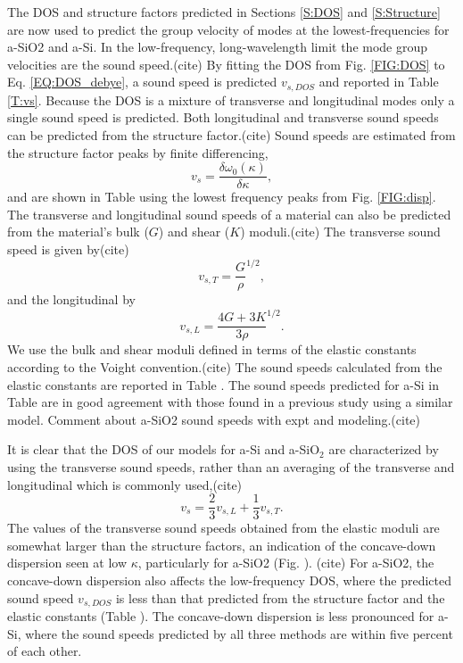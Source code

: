 \documentclass[aps,prb,onecolumn,preprint,superscriptaddress,footinbib,amsmath,amssymb,floatfix]{revtex4}
\begin{document}
The DOS and structure factors predicted in Sections \ref{S:DOS} and 
\ref{S:Structure} are now used to 
predict the group velocity of modes at the lowest-frequencies for 
a-SiO2 and a-Si. In the low-frequency, long-wavelength limit the 
mode group velocities are the sound speed.(cite) 
By fitting the DOS 
from Fig. \ref{FIG:DOS} to Eq. \eqref{EQ:DOS_debye}, 
a sound speed is predicted $v_{s,DOS}$ and 
reported in Table \ref{T:vs}. Because the DOS is a mixture of 
transverse and longitudinal modes only a single sound speed is predicted. 
Both longitudinal and transverse sound speeds can be predicted from 
the structure factor.(cite) 
Sound speeds are estimated from the structure factor peaks by finite 
differencing,\begin{equation}\label{EQ:vs_dwdk}
v_{s} = \frac{ \delta \omega_0(\kappa)}{\delta \kappa},
\end{equation}
and are shown in Table using the lowest frequency peaks 
from Fig. \ref{FIG:disp}. 
The transverse and longitudinal sound speeds of a material can 
also be predicted from the material's bulk ($G$) and 
shear ($K$) moduli.(cite) The transverse sound speed is given by(cite)  
\begin{equation}\label{EQ:vs_T_elas}
v_{s,T} = \frac{G}{\rho}^{1/2},
\end{equation}
and the longitudinal by
\begin{equation}\label{EQ:vs_L_elas}
v_{s,L} = \frac{4G + 3K}{3\rho}^{1/2}.
\end{equation}
We use the bulk and shear moduli defined in terms of the elastic 
constants according to the Voight convention.(cite) 
The sound speeds calculated from the 
elastic constants are reported in Table . 
The sound speeds predicted for a-Si in Table are in good agreement 
with those found in a previous study using a similar 
model.\cite{feldman_thermal_1993,feldman_numerical_1999} 
Comment about a-SiO2 sound speeds with expt and modeling.(cite)

It is clear that the DOS of 
our models for a-Si and a-SiO$_2$ are characterized by using the 
transverse sound speeds, rather than an averaging of the transverse 
and longitudinal which is commonly used,(cite)  
\begin{equation}\label{EQ:vs_avg}
v_{s} = \frac{2}{3}v_{s,L} + \frac{1}{3}v_{s,T}. 
\end{equation} 
The values of the transverse sound speeds obtained from the 
elastic moduli are somewhat larger than the structure factors, 
an indication of the concave-down dispersion seen at low 
$\kappa$, particularly for a-SiO2 (Fig. ).
(cite) For a-SiO2, the concave-down dispersion
also affects the low-frequency DOS, where the predicted sound speed 
$v_{s,DOS}$ is less than that predicted from the structure factor 
and the elastic constants (Table ). The concave-down dispersion 
is less pronounced for a-Si, where the sound speeds predicted 
by all three methods are within five percent of each other. 
\end{document}
